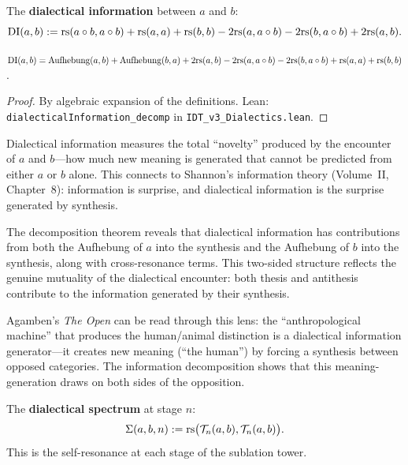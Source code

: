 \begin{definition}
\label{def:dialectical-info}
The \textbf{dialectical information} between $a$ and $b$:
\[
\mathrm{DI}(a, b) := \mathrm{rs}(a \circ b, a \circ b) + \mathrm{rs}(a, a) + \mathrm{rs}(b, b)
- 2\mathrm{rs}(a, a \circ b) - 2\mathrm{rs}(b, a \circ b) + 2\mathrm{rs}(a, b).
\]
\end{definition}

\begin{theorem}
\label{thm:dialectical-info-decomp}
$\mathrm{DI}(a, b) = \mathrm{Aufhebung}(a, b) + \mathrm{Aufhebung}(b, a) +
2\mathrm{rs}(a, b) - 2\mathrm{rs}(a, a \circ b) - 2\mathrm{rs}(b, a \circ b) + \mathrm{rs}(a, a) + \mathrm{rs}(b, b)$.
\end{theorem}

\begin{proof}
By algebraic expansion of the definitions.
Lean: \texttt{dialecticalInformation\_decomp} in
\texttt{IDT\_v3\_Dialectics.lean}.
\end{proof}

\begin{interpretation}
Dialectical information measures the total ``novelty'' produced by the
encounter of $a$ and $b$---how much new meaning is generated that cannot
be predicted from either $a$ or $b$ alone. This connects to Shannon's
information theory (Volume~II, Chapter~8): information is surprise, and
dialectical information is the surprise generated by synthesis.

The decomposition theorem reveals that dialectical information has
contributions from both the Aufhebung of $a$ into the synthesis and the
Aufhebung of $b$ into the synthesis, along with cross-resonance terms.
This two-sided structure reflects the genuine mutuality of the dialectical
encounter: both thesis and antithesis contribute to the information
generated by their synthesis.

Agamben's \textit{The Open} can be read through this lens: the
``anthropological machine'' that produces the human/animal distinction is
a dialectical information generator---it creates new meaning (``the human'')
by forcing a synthesis between opposed categories. The information
decomposition shows that this meaning-generation draws on both sides
of the opposition.
\end{interpretation}

\begin{definition}
\label{def:dialectical-spectrum}
The \textbf{dialectical spectrum} at stage $n$:
\[
\Sigma(a, b, n) := \mathrm{rs}\bigl(\mathcal{T}_n(a, b), \mathcal{T}_n(a, b)\bigr).
\]
This is the self-resonance at each stage of the sublation tower.
\end{definition}

